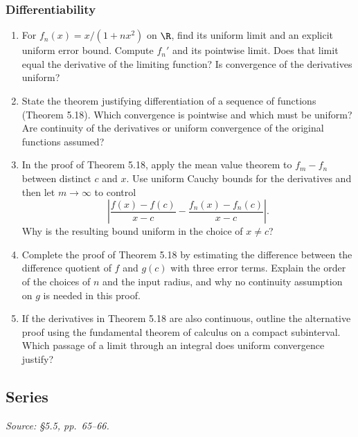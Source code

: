 \subsubsection*{Differentiability}
\begin{enumerate}[resume]
  \item For \(f_n(x)=x/(1+nx^2)\) on \(\R\), find its uniform
    limit and an explicit uniform error bound.
    Compute \(f_n'\) and its pointwise limit. Does that limit equal
    the derivative of the limiting function? Is convergence of
    the derivatives uniform?

  \item State the theorem justifying differentiation of a sequence
    of functions (Theorem 5.18). Which convergence is pointwise
    and which must be uniform? Are continuity of the derivatives
    or uniform convergence of the original functions assumed?

  \item In the proof of Theorem 5.18, apply the mean value theorem
    to \(f_m-f_n\) between distinct \(c\) and \(x\).
    Use uniform Cauchy bounds for the derivatives and then let
    \(m\to\infty\) to control
    \[
      \left|\frac{f(x)-f(c)}{x-c}
        -\frac{f_n(x)-f_n(c)}{x-c}\right|.
    \]
    Why is the resulting bound uniform in the choice of \(x\ne c\)?

  \item Complete the proof of Theorem 5.18 by estimating the difference
    between the difference quotient of \(f\) and \(g(c)\) with
    three error terms. Explain the order of the choices of \(n\)
    and the input radius, and why no continuity assumption on \(g\)
    is needed in this proof.

  \item If the derivatives in Theorem 5.18 are also continuous,
    outline the alternative proof using the fundamental theorem of
    calculus on a compact subinterval. Which passage of a limit
    through an integral does uniform convergence justify?
\end{enumerate}

\subsection{Series}
\textit{Source: \S5.5, pp.~65--66.}

